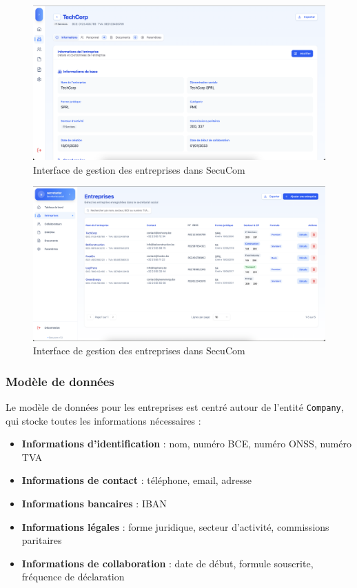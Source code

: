\begin{figure}[H]
  \centering
  \includegraphics[width=1\textwidth]{SecuComPreviewCompany.png}
  \caption{Interface de gestion des entreprises dans SecuCom}
  \label{fig:companyManagementInterface}
\end{figure}
\vspace{0.5cm}
\begin{figure}[H]
  \centering
  \includegraphics[width=1\textwidth]{SecuComPreviewCompanyList.png}
  \caption{Interface de gestion des entreprises dans SecuCom}
  \label{fig:companyManagementInterface}
\end{figure}

\subsubsection{Modèle de données}

Le modèle de données pour les entreprises est centré autour de l'entité \texttt{Company}, qui stocke toutes les informations nécessaires :

\vspace{0.5cm}

\begin{itemize}[leftmargin=*,label=\textcolor{darkgray}{$\bullet$},itemsep=0.3em]
  \item \textbf{Informations d'identification} : nom, numéro BCE, numéro ONSS, numéro TVA
  \item \textbf{Informations de contact} : téléphone, email, adresse
  \item \textbf{Informations bancaires} : IBAN
  \item \textbf{Informations légales} : forme juridique, secteur d'activité, commissions paritaires
  \item \textbf{Informations de collaboration} : date de début, formule souscrite, fréquence de déclaration
\end{itemize}

